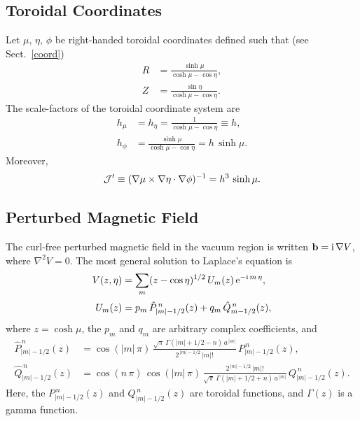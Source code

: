 \documentclass[12pt,prb,aps]{revtex4-1}
\begin{document}
\subsection{Toroidal Coordinates}
Let $\mu$, $\eta$, $\phi$ be right-handed toroidal coordinates defined such that (see Sect.~\ref{coord})
\begin{align}
R &= \frac{\sinh\mu}{\cosh\mu-\cos\eta},\\[0.5ex]
Z&=\frac{\sin\eta}{\cosh\mu-\cos\eta}.
\end{align}
The scale-factors of the toroidal coordinate system are
\begin{align}
h_\mu&=h_\eta= \frac{1}{\cosh\mu-\cos\eta}\equiv h,\\[0.5ex]
h_\phi &= \frac{\sinh\mu}{\cosh\mu-\cos\eta} = h\,\sinh\mu.
\end{align}
Moreover, 
\begin{equation}
{\cal J}' \equiv (\nabla\mu\times\nabla\eta\cdot\nabla\phi)^{-1}= h^3\,\sinh\mu.
\end{equation}

\subsection{Perturbed Magnetic Field}
The curl-free perturbed magnetic field in the vacuum region is written ${\bf b} = {\rm i}\,\nabla V$,
where
$\nabla^2 V =0$.
The most general solution to Laplace's equation is
\begin{align}
V(z,\eta)&= \sum_m (z-\cos\eta)^{1/2}\,U_m(z)\,{\rm e}^{-{\rm i}\,m\,\eta}, \\[0.5ex]
U_m(z) &= p_m\,\hat{P}_{|m|-1/2}^{\,n}(z)+q_m\,\hat{Q}_{m-1/2}^{\,n}(z),
\end{align}
where  $z=\cosh\mu$, the $p_m$ and $q_m$ are arbitrary complex coefficients, and 
\begin{align}\label{e21}
\hat{P}_{|m|-1/2}^{\,n}(z) &= \cos(|m|\,\pi)\,\frac{\sqrt{\pi}\,\Gamma(|m|+1/2-n)\,a^{\,|m|}}{2^{\,|m|-1/2}\,|m|!}\,P_{|m|-1/2}^{\,n}(z),\\[0.5ex]
\hat{Q}_{|m|-1/2}^{\,n}(z)&= \cos(n\,\pi)\,\cos(|m|\,\pi)\,\frac{2^{\,|m|-1/2}\,|m|!}{\sqrt{\pi}\,\Gamma(|m|+1/2+n)\,a^{\,|m|}}\,Q_{|m|-1/2}^{\,n}(z).\label{e22}
\end{align}
Here,  the $P_{|m|-1/2}^{\,n}(z)$  and $Q_{|m|-1/2}^{\,n}(z)$ are toroidal functions,\cite{abrama}  and $\Gamma(z)$ is a
gamma function.\cite{abramb}
\end{document}
